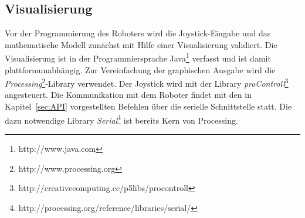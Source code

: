 \subsection{Visualisierung}
Vor der Programmierung des Roboters wird die Joystick-Eingabe und das mathematische Modell zunächst mit Hilfe einer Visualisierung validiert.
Die Visualisierung ist in der Programmiersprache Java\footnote{http://www.java.com} verfasst und ist damit plattformunabhängig.
Zur Vereinfachung der graphischen Ausgabe wird die \emph{Processing}\footnote{http://www.processing.org}-Library verwendet.
Der Joystick wird mit der Library \emph{proControll}\footnote{http://creativecomputing.cc/p5libs/procontroll} angesteuert.
Die Kommunikation mit dem Roboter findet mit den in Kapitel~\ref{sec:API} vorgestellten Befehlen über die serielle Schnittstelle statt. Die dazu notwendige Library \emph{Serial}\footnote{http://processing.org/reference/libraries/serial/} ist bereits Kern von Processing.
